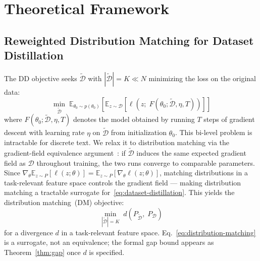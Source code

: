 \section{Theoretical Framework} \label{sec:52-research03-theory}

\subsection{Reweighted Distribution Matching for Dataset Distillation} \label{sec:52-research03-theory-rdm}
\begin{foldable} %
    The \acl{DD} objective seeks $\tilde{\mathcal{D}}$ with $|\tilde{\mathcal{D}}| = K \ll N$ minimizing the loss on the original data:
    \begin{equation}
        \min_{\tilde{\mathcal{D}}}\; \mathbb{E}_{\theta_0 \sim p(\theta_0)} \left[ \mathbb{E}_{z \sim \mathcal{D}} \left[ \ell\!\left(z;\; F(\theta_0; \tilde{\mathcal{D}}, \eta, T)\right) \right] \right]
        \label{eq:dataset-distillation}
    \end{equation}
    where $F(\theta_0; \tilde{\mathcal{D}}, \eta, T)$ denotes the model obtained by running $T$ steps of gradient descent with learning rate $\eta$ on $\tilde{\mathcal{D}}$ from initialization $\theta_0$.
    This bi-level problem is intractable for discrete text.
    We relax it to distribution matching via the gradient-field equivalence argument~\cite{zhao2023dataset}: if $\tilde{\mathcal{D}}$ induces the same expected gradient field as $\mathcal{D}$ throughout training, the two runs converge to comparable parameters.
    Since $\nabla_\theta \mathbb{E}_{z \sim P}[\ell(z;\theta)] = \mathbb{E}_{z \sim P}[\nabla_\theta \ell(z;\theta)]$, matching distributions in a task-relevant feature space controls the gradient field --- making distribution matching a tractable surrogate for~\eqref{eq:dataset-distillation}.
    This yields the distribution matching~(DM) objective:
    \begin{equation}
        \min_{|\tilde{\mathcal{D}}| = K}\; d\!\left(P_{\tilde{\mathcal{D}}},\; P_{\mathcal{D}}\right)
        \label{eq:distribution-matching}
    \end{equation}
    for a divergence $d$ in a task-relevant feature space.
    Eq.~\eqref{eq:distribution-matching} is a surrogate, not an equivalence; the formal gap bound appears as Theorem~\ref{thm:gap} once $d$ is specified.
\end{foldable}

